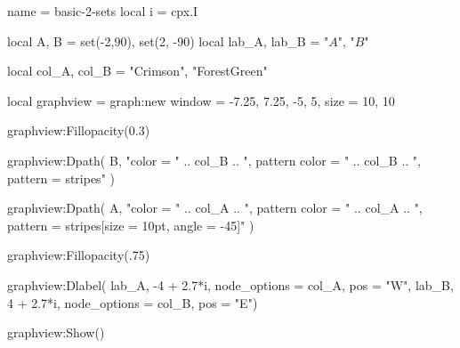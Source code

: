 \documentclass{standalone}
\begin{document}
\begin{luadraw}{name = basic-2-sets}
  local i = cpx.I

  local A, B = set(-2,90), set(2, -90)
  local lab_A, lab_B = "$A$", "$B$"

  local col_A, col_B = "Crimson", "ForestGreen"

  local graphview = graph:new{
    window = {-7.25, 7.25, -5, 5},
    size   = {10, 10}
  }

  graphview:Fillopacity(0.3)

  graphview:Dpath(
    B,
      "color = "
    .. col_B
    .. ", pattern color = "
    .. col_B
    .. ", pattern = stripes"
  )

  graphview:Dpath(
    A,
      "color = "
    .. col_A
    .. ", pattern color = "
    .. col_A
    .. ", pattern = {stripes[size = 10pt, angle = -45]}"
  )

  graphview:Fillopacity(.75)

  graphview:Dlabel(
    lab_A, -4 + 2.7*i, {node_options = col_A, pos = "W"},
    lab_B,  4 + 2.7*i, {node_options = col_B, pos = "E"})

  graphview:Show()
\end{luadraw}
\end{document}
